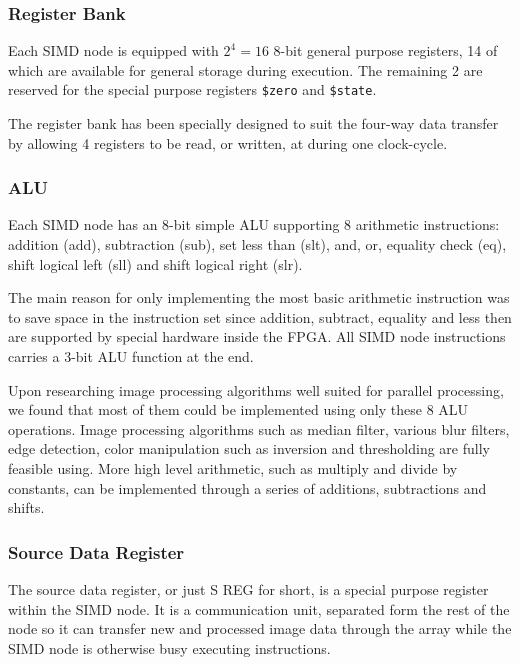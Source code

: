 \subsubsection{Register Bank}
Each \ac{SIMD} node is equipped with $2^4 = 16$ 8-bit general purpose registers, 14 of
which are available for general storage during execution. The remaining 2 are
reserved for the special purpose registers {\tt \$zero} and {\tt \$state}.



The register bank has been specially designed to suit the four-way data transfer by
allowing 4 registers to be read, or written, at during one clock-cycle.

\subsubsection{ALU}
Each \ac{SIMD} node has an 8-bit simple ALU supporting 8 arithmetic instructions: 
addition ({\sc add}), subtraction ({\sc sub}), set less than ({\sc slt}), {\sc and}, 
{\sc or}, equality check ({\sc eq}), shift logical left ({\sc sll}) and shift logical 
right ({\sc slr}). 

The main reason for only implementing the most basic arithmetic instruction was to save
space in the instruction set since addition, subtract, equality and less then are 
supported by special hardware inside the FPGA. All \ac{SIMD} node instructions carries
a 3-bit \ac{ALU} function at the end.

Upon researching image processing algorithms well suited for parallel processing, we
found that most of them could be implemented using only these 8 \ac{ALU} operations. 
Image processing algorithms such as median filter, various blur filters, edge detection, 
color manipulation such as inversion and thresholding are fully feasible using. More high
level arithmetic, such as multiply and divide by constants, can be implemented
through a series of additions, subtractions and shifts.


\subsubsection{Source Data Register}
The source data register, or just S REG for short, is a special purpose
register within the \ac{SIMD} node. It is a communication unit, separated form
the rest of the node so it can transfer new and processed image data through the
array while the \ac{SIMD} node is otherwise busy executing instructions.

